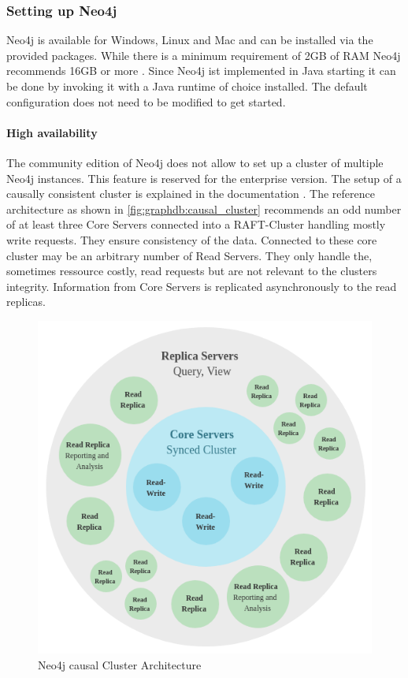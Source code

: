 \subsubsection{Setting up Neo4j}
Neo4j is available for Windows, Linux and Mac and can be installed via the provided packages. While there is a minimum requirement of 2GB of RAM Neo4j recommends 16GB or more \autocite[Chapter~2.1]{neo4j:op_manual}.
Since Neo4j ist implemented in Java starting it can be done by invoking it with a Java runtime of choice installed. The default configuration does not need to be modified to get started.

\paragraph{High availability} \label{par:graphdb:ha} The community edition of Neo4j does not allow to set up a cluster of multiple Neo4j instances.
This feature is reserved for the enterprise version.
The setup of a causally consistent cluster is explained in the documentation \autocite[Chapter~5.1]{neo4j:op_manual}.
The reference architecture as shown in \autoref{fig:graphdb:causal_cluster} recommends an odd number of at least three \glqq Core Servers\grqq{} connected into a RAFT-Cluster handling mostly write requests.
They ensure consistency of the data.
Connected to these core cluster may be an arbitrary number of \glqq Read Servers\grqq.
They only handle the, sometimes ressource costly, read requests but are not relevant to the clusters integrity.
Information from Core Servers is replicated asynchronously to the read replicas.
\begin{figure}[ht]
    \centering
    \includegraphics[width=.5\textwidth]{img/causal_clustering.png}
    \caption{Neo4j causal Cluster Architecture \autocite[Chapter~5.1]{neo4j:op_manual}}
    \label{fig:graphdb:causal_cluster}
\end{figure}

